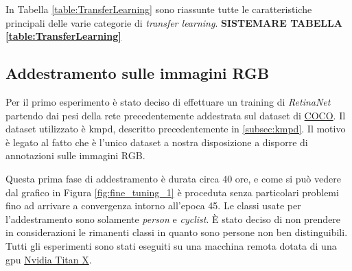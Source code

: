 In Tabella \ref{table:TransferLearning} sono riassunte tutte le caratteristiche principali delle varie categorie di \textit{transfer learning}.
\textbf{SISTEMARE TABELLA \ref{table:TransferLearning}}
\begin{table}[]
    \centering
    \caption{Schema riassuntivo delle categorie di Transfer Learning}
    \label{table:TransferLearning}
\end{table}
\subsection{Addestramento sulle immagini RGB}
\label{subsec:first_training_rgb_kaist}
Per il primo esperimento è stato deciso di effettuare un training di \textit{RetinaNet} partendo dai pesi della rete precedentemente addestrata sul dataset di \href{http://cocodataset.org/}{COCO}. Il dataset utilizzato è \ac{kmpd}, descritto precedentemente in \ref{subsec:kmpd}. Il motivo è legato al fatto che è l'unico dataset a nostra disposizione a disporre di annotazioni sulle immagini RGB.

Questa prima fase di addestramento è durata circa $40$ ore, e come si può vedere dal grafico in Figura \ref{fig:fine_tuning_1} è proceduta senza particolari problemi fino ad arrivare a convergenza intorno all'epoca 45. Le classi usate per l'addestramento sono solamente \textit{person} e \textit{cyclist}. È stato deciso di non prendere in considerazioni le rimanenti classi in quanto sono persone non ben distinguibili. Tutti gli esperimenti sono stati eseguiti su una macchina remota dotata di una \ac{gpu} \href{https://www.geforce.com/hardware/desktop-gpus/geforce-gtx-titan-x}{Nvidia Titan X}.

